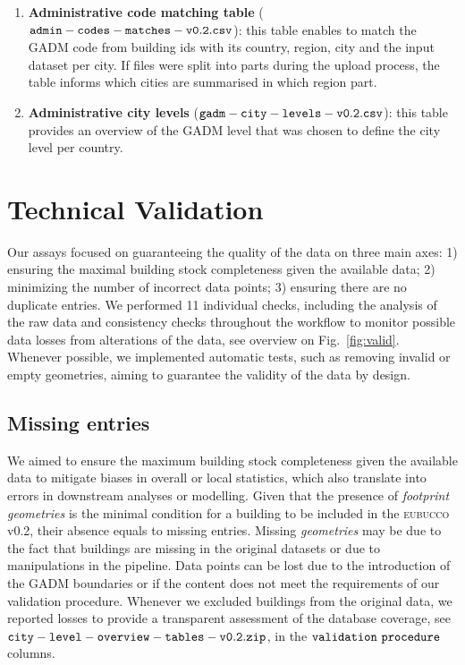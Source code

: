\documentclass[fleqn,10pt]{wlscirep}
\begin{document}
\begin{enumerate}[topsep=1pt]
    \item \textbf{Administrative code matching table} (${\tt admin-codes-matches-v0.2.csv}$): this table enables to match the GADM code from building ids with its country, region, city and the input dataset per city. If files were split into parts during the upload process, the table informs which cities are summarised in which region part.
    
    \item \textbf{Administrative city levels} (${\tt gadm-city-levels-v0.2.csv}$): this table provides an overview of the GADM level that was chosen to define the city level per country.
    
\end{enumerate}


\section*{Technical Validation}
Our assays focused on guaranteeing the quality of the data on three main axes: 1) ensuring the maximal building stock completeness given the available data; 2) minimizing the number of incorrect data points; 3) ensuring there are no duplicate entries. We performed 11 individual checks, including the analysis of the raw data and consistency checks throughout the workflow to monitor possible data losses from alterations of the data, see overview on Fig.~\ref{fig:valid}. Whenever possible, we implemented automatic tests, such as removing invalid or empty geometries, aiming to guarantee the validity of the data by design.   



\subsection*{Missing entries}

We aimed to ensure the maximum building stock completeness given the available data to mitigate biases in overall or local statistics, which also translate into errors in downstream analyses or modelling. 
Given that the presence of \textit{footprint geometries} is the minimal condition for a building to be included in the \textsc{eubucco} v0.2, their absence equals to missing entries. 
Missing \textit{geometries} may be due to the fact that buildings are missing in the original datasets or due to manipulations in the pipeline. Data points can be lost due to the introduction of the GADM boundaries or if the content does not meet the requirements of our validation procedure. Whenever we excluded buildings from the original data, we reported losses to provide a transparent assessment of the database coverage, see ${\tt city-level-overview-tables-v0.2.zip}$, in the ${\tt validation\ procedure}$ columns.
\end{document}
